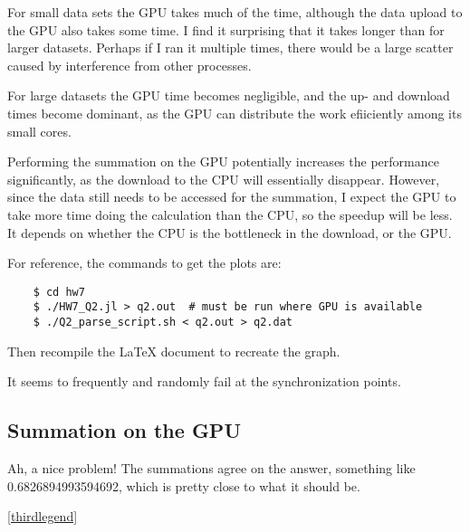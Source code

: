 \documentclass[11pt]{article}
\begin{document}
For small data sets the GPU takes much of the time, although the data upload to
the GPU also takes some time. I find it surprising that it takes longer than
for larger datasets. Perhaps if I ran it multiple times, there would be a large
scatter caused by interference from other processes.

For large datasets the GPU time becomes negligible, and the up- and download
times become dominant, as the GPU can distribute the work efiiciently among its
small cores.

Performing the summation on the GPU potentially increases the performance
significantly, as the download to the CPU will essentially disappear. However,
since the data still needs to be accessed for the summation, I expect the GPU
to take more time doing the calculation than the CPU, so the speedup will be
less. It depends on whether the CPU is the bottleneck in the download, or the
GPU.

For reference, the commands to get the plots are:
\begin{center}
\begin{verbatim}
    $ cd hw7
    $ ./HW7_Q2.jl > q2.out  # must be run where GPU is available
    $ ./Q2_parse_script.sh < q2.out > q2.dat
\end{verbatim}
\end{center}
Then recompile the \LaTeX{} document  to recreate the graph.

It seems to frequently and randomly fail at the synchronization points.


\subsection{Summation on the GPU}

Ah, a nice problem! The summations agree on the answer, something like
\num{0.6826894993594692}, which is pretty close to what it should be.

\begin{center}
  \ref{thirdlegend}
\end{center}
\end{document}
